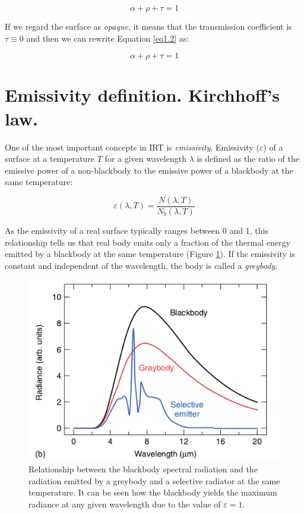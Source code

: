 		\begin{equation}\label{eq1.2}
			\alpha + \rho + \tau = 1
		\end{equation}
		
		If we regard the surface as \textit{opaque}, it means that the transmission coefficient is $\tau \equiv 0$ and then we can rewrite Equation \ref{eq1.2} as:	
		
		\begin{equation}\label{eq1.3}
			\alpha + \rho + \tau = 1
		\end{equation}
		
	\section{Emissivity definition. Kirchhoff's law.}\label{section1.3}
		
		One of the most important concepts in IRT is \textit{emissivity}. Emissivity ($\varepsilon$) of a surface at a temperature $T$ for a given wavelength $\lambda$ is defined as the ratio of the emissive power of a  non-blackbody to the emissive power of a blackbody at the same temperature:
		
		\begin{equation}\label{eq1.4}
			\varepsilon(\lambda,T)=\frac{N(\lambda,T)}{N_{b}(\lambda,T)}
		\end{equation}
		
		As the emissivity of a real surface typically ranges between 0 and 1, this relationship tells us that real body emits only a fraction of the thermal energy emitted by a blackbody at the same temperature (Figure \ref{fig1.4}). If the emissivity is constant and independent of the wavelength, the body is called a \textit{greybody}.
		
		\begin{figure}[ht!]
			\centering
			\captionsetup{justification=centering,margin=2cm}
			\includegraphics[scale=0.45]{Figures/Chapter01/BlackAndGreybodyComparison.pdf}
			\caption{Relationship between the blackbody spectral radiation and the radiation emitted by a greybody and a selective radiator at the same temperature. It can be seen how the blackbody yields the maximum radiance at any given wavelength due to the value of $\varepsilon=1$.}\label{fig1.4}
		\end{figure}
		
